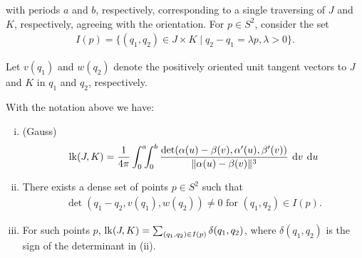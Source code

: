 with periods $a$ and $b$, respectively, corresponding to a single traversing of $J$ and
$K$, respectively, agreeing with the orientation. For $p\in S^2$, consider the set
\begin{align*}
  I(p) = \{(q_1, q_2)\in J\times K\mid q_2-q_1 = \lambda p, \lambda>0\}.
\end{align*}

Let $v(q_1)$ and $w(q_2)$ denote the positively oriented unit tangent vectors to $J$ and
$K$ in $q_1$ and $q_2$, respectively.


\begin{theorem}\label{theorem:11-14}
  With the notation above we have:
  \begin{enumerate}[(i)]
    \item (Gauss)
      \begin{align*}
        \R{lk}(J, K) = \frac{1}{4\pi }\int_0^a\mkern-8mu\int_0^b \frac{\det (\alpha(u) - \beta(v), \alpha'(u), \beta'(v))}
          {\|\alpha(u) - \beta(v)\|^3}\,\dd v\,\dd u
      \end{align*}
    \item There exists a dense set of points $p\in S^2$ such that
      \begin{align*}
        \det(q_1 - q_2, v(q_1), w(q_2)) \neq 0 \text{ for } (q_1, q_2)\in I(p).
      \end{align*}
    \item For such points $p$, $\mathrm{lk}(J, K) = \sum_{(q_1, q_2)\in I(p)}^{}{\delta(q_1, q_2)}$, 
      where $\delta(q_1, q_2)$ is the sign of the determinant in (ii).
  \end{enumerate}
\end{theorem}

